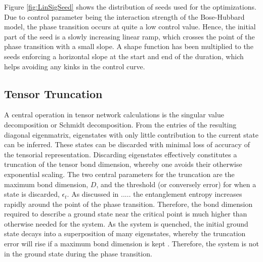 Figure \ref{fig:LinSigSeed} shows the distribution of seeds used for the optimizations. Due to control parameter being the interaction strength of the Bose-Hubbard model, the phase transition occurs at quite a low control value. Hence, the initial part of the seed is a slowly increasing linear ramp, which crosses the point of the phase transition with a small slope. A shape function has been multiplied to the seeds enforcing a horizontal slope at the start and end of the duration, which helps avoiding any kinks in the control curve.


\subsection{Tensor Truncation}
A central operation in tensor network calculations is the singular value decomposition or Schmidt decomposition. From the entries of the resulting diagonal eigenmatrix, eigenstates with only little contribution to the current state can be inferred. These states can be discarded with minimal loss of accuracy of the tensorial representation. Discarding eigenstates effectively constitutes a truncation of the tensor bond dimension, whereby one avoids their otherwise exponential scaling. The two central parameters for the truncation are the maximum bond dimension, $D$, and the threshold (or conversely error) for when a state is discarded, $\epsilon_t$.
As discussed in ..... the entanglement entropy increases rapidly around the point of the phase transition. Therefore, the bond dimension required to describe a ground state near the critical point is much higher than otherwise needed for the system. As the system is quenched, the initial ground state decays into a superposition of many eigenstates, whereby the truncation error will rise if a maximum bond dimension is kept \cite{Daley2004}. Therefore, the system is not in the ground state during the phase transition.

